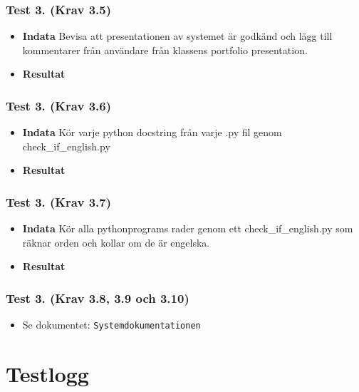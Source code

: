 \documentclass{TDP003mall}
\begin{document}
\subsubsection*{Test 3. (Krav 3.5)}
\begin{itemize}
\item[]\textbf{Indata} Bevisa att presentationen av systemet är godkänd och lägg till kommentarer från användare från klassens portfolio presentation.
\item[]\textbf{Resultat} 
\end{itemize}
\subsubsection*{Test 3. (Krav 3.6)}
\begin{itemize}
\item[]\textbf{Indata} Kör varje python docstring från varje .py fil genom check\_if\_english.py
\item[]\textbf{Resultat} 
\end{itemize}
\subsubsection*{Test 3. (Krav 3.7)}
\begin{itemize}
\item[]\textbf{Indata} Kör alla pythonprograms rader genom ett check\_if\_english.py som räknar orden och kollar om de är engelska. 
\item[]\textbf{Resultat} 
\end{itemize}
\subsubsection*{Test 3. (Krav 3.8, 3.9 och 3.10)}
\begin{itemize}
\item[] Se dokumentet: \texttt{Systemdokumentationen}
\end{itemize}





\section{Testlogg}
\end{document}
